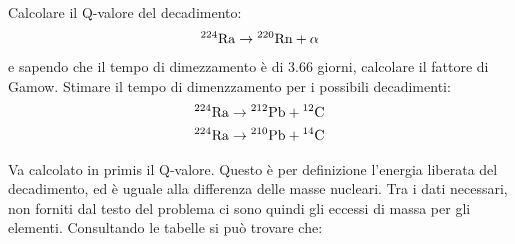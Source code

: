 \documentclass[../main.tex]{subfiles}
\begin{document}
		\begin{ese}[4.1]
			Calcolare il Q-valore del decadimento:
			\begin{gather}
			\mathrm{^{224}Ra}\to\mathrm{^{220}Rn}+\alpha 
			\end{gather}
			e sapendo che il tempo di dimezzamento è di 3.66 giorni, calcolare il fattore di Gamow.
			Stimare il tempo di dimenzzamento per i possibili decadimenti:
			\begin{gather}
			\mathrm{^{224}Ra}\to\mathrm{^{212}Pb}+\mathrm{^{12}C} \\
			 \mathrm{^{224}Ra}\to\mathrm{^{210}Pb}+\mathrm{^{14}C}
			 \end{gather} 
		\end{ese}
		\begin{svol}
			Va calcolato in primis il Q-valore. Questo è per definizione l'energia liberata del decadimento, ed è uguale alla differenza delle masse nucleari. Tra i dati necessari, non forniti dal testo del problema ci sono quindi gli eccessi di massa per gli elementi. Consultando le tabelle si può trovare che:
			

\end{svol}
\end{document}
